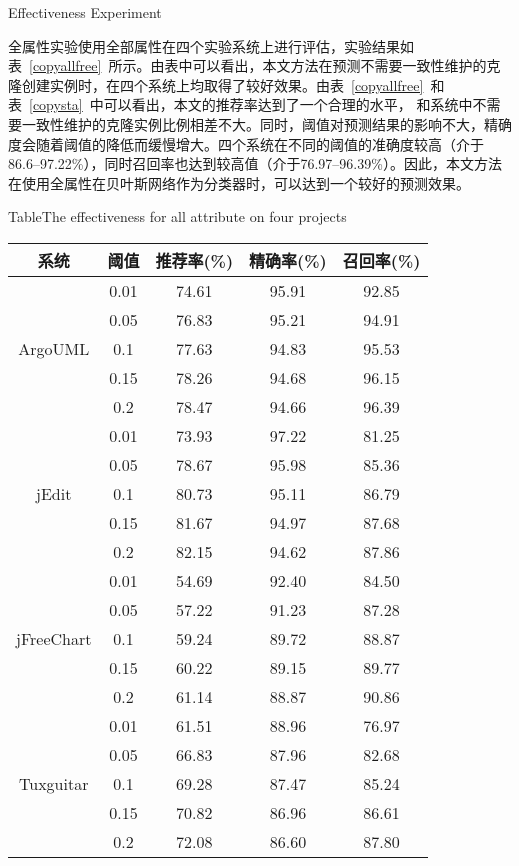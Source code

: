 {Effectiveness Experiment}

全属性实验使用全部属性在四个实验系统上进行评估，实验结果如表~\ref{copyallfree}~所示。由表中可以看出，本文方法在预测不需要一致性维护的克隆创建实例时，在四个系统上均取得了较好效果。由表~\ref{copyallfree}~和表~\ref{copysta}~中可以看出，本文的推荐率达到了一个合理的水平， 和系统中不需要一致性维护的克隆实例比例相差不大。同时，阈值对预测结果的影响不大，精确度会随着阈值的降低而缓慢增大。四个系统在不同的阈值的准确度较高（介于86.6--97.22\%），同时召回率也达到较高值（介于76.97--96.39\%）。因此，本文方法在使用全属性在贝叶斯网络作为分类器时，可以达到一个较好的预测效果。

\begin{table}[htbp]
{Table$\!$}{The effectiveness for all attribute on four projects}
\vspace{0.5em}
\centering
\wuhao
\begin{tabular}{ccccc}
\toprule[1.5pt]
{系统}&{阈值}&{推荐率(\%)}&{精确率(\%)}&{召回率(\%)}\\
\midrule[1pt]
\multirow{5}{*}{ArgoUML}
&0.01&	74.61&	95.91&	92.85\\
&0.05&	76.83&	95.21&	94.91\\
&0.1&	77.63&	94.83&	95.53\\
&0.15&  78.26&	94.68&	96.15\\
&0.2&	78.47&	94.66&	96.39\\
\hline
\multirow{5}{*}{jEdit}
&0.01&	73.93&	97.22&	81.25\\
&0.05&	78.67&	95.98&	85.36	\\
&0.1&	80.73&	95.11&	86.79	\\
&0.15&	81.67&	94.97&	87.68	\\
&0.2&	82.15&	94.62&	87.86	\\
\hline
\multirow{5}{*}{jFreeChart}
&0.01&	54.69&	92.40&	84.50\\
&0.05&	57.22&	91.23&	87.28\\
&0.1&	59.24&	89.72&	88.87\\
&0.15&	60.22&	89.15&	89.77\\
&0.2&	61.14&	88.87&	90.86\\
\hline
\multirow{5}{*}{Tuxguitar}
&0.01&	61.51&	88.96&	76.97\\
&0.05&	66.83&	87.96&	82.68\\
&0.1&	69.28&	87.47&	85.24\\
&0.15&	70.82&	86.96&	86.61\\
&0.2&	72.08&	86.60&	87.80\\
\bottomrule[1.5pt]
\end{tabular}
\end{table}

